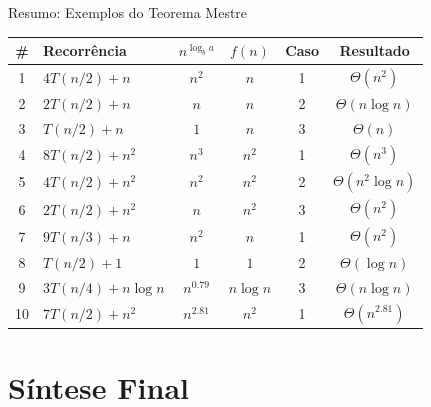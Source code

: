\documentclass[aspectratio=169]{beamer}
\begin{document}
\begin{frame}{Resumo: Exemplos do Teorema Mestre}
    \begin{center}
    \renewcommand{\arraystretch}{1.15}
    \footnotesize
    \begin{tabular}{clcccc}
        \toprule
        \textbf{\#} & \textbf{Recorrência} & $n^{\log_b a}$ & $f(n)$ & \textbf{Caso} & \textbf{Resultado} \\
        \midrule
        1  & $4T(n/2)+n$            & $n^2$          & $n$         & 1 & $\Theta(n^2)$ \\
        2  & $2T(n/2)+n$            & $n$            & $n$         & 2 & $\Theta(n \log n)$ \\
        3  & $T(n/2)+n$             & $1$            & $n$         & 3 & $\Theta(n)$ \\
        4  & $8T(n/2)+n^2$          & $n^3$          & $n^2$       & 1 & $\Theta(n^3)$ \\
        5  & $4T(n/2)+n^2$          & $n^2$          & $n^2$       & 2 & $\Theta(n^2 \log n)$ \\
        6  & $2T(n/2)+n^2$          & $n$            & $n^2$       & 3 & $\Theta(n^2)$ \\
        7  & $9T(n/3)+n$            & $n^2$          & $n$         & 1 & $\Theta(n^2)$ \\
        8  & $T(n/2)+1$             & $1$            & $1$         & 2 & $\Theta(\log n)$ \\
        9  & $3T(n/4)+n\log n$      & $n^{0.79}$     & $n\log n$   & 3 & $\Theta(n \log n)$ \\
        10 & $7T(n/2)+n^2$          & $n^{2.81}$     & $n^2$       & 1 & $\Theta(n^{2.81})$ \\
        \bottomrule
    \end{tabular}
    \end{center}
\end{frame}

\section{Síntese Final}
\end{document}
